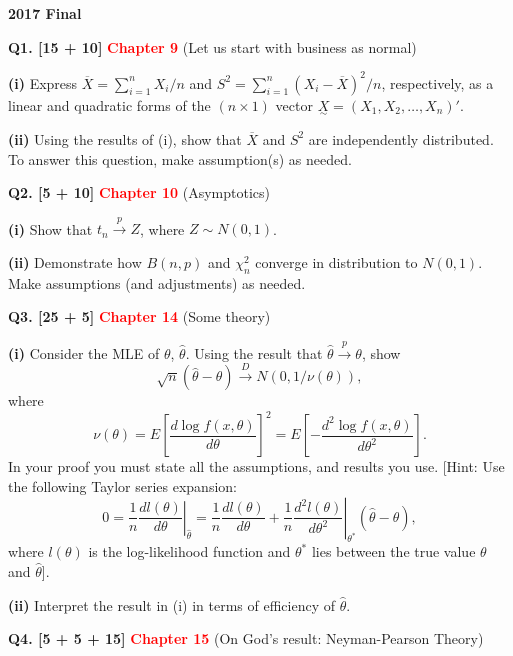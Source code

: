 \documentclass[11pt]{article}
\begin{document}
\begin{center}
    {\Large\bfseries 2017 Final}
\end{center}

\vspace{1em}

\textbf{Q1. [15 + 10]} \textbf{\textcolor{red}{Chapter 9}} (Let us start with business as normal)

\textbf{(i)} Express $\overline X=\sum_{i=1}^{n}X_i/n$ and $S^2=\sum_{i=1}^{n}(X_i-\overline X)^2/n$, respectively, as a linear and quadratic forms of the $(n\times 1)$ vector $\underset{\sim}{X}=(X_1,X_2,\ldots,X_n)'$.

\textbf{(ii)} Using the results of (i), show that $\overline X$ and $S^2$ are independently distributed. To answer this question, make assumption(s) as needed.

\bigskip

\textbf{Q2. [5 + 10]} \textbf{\textcolor{red}{Chapter 10}} (Asymptotics)

\textbf{(i)} Show that $t_n\overset{p}{\longrightarrow} Z$, where $Z\sim N(0,1)$.

\textbf{(ii)} Demonstrate how $B(n,p)$ and $\chi_n^2$ converge in distribution to $N(0,1)$. Make assumptions (and adjustments) as needed.

\bigskip

\textbf{Q3. [25 + 5]} \textbf{\textcolor{red}{Chapter 14}} (Some theory)

\textbf{(i)} Consider the MLE of $\theta$, $\hat\theta$. Using the result that $\hat\theta\overset{p}{\longrightarrow}\theta$, show
\[
\sqrt{n}(\hat\theta-\theta)\overset{D}{\longrightarrow}N\left(0,1/\nu(\theta)\right),
\]
where
\[
\nu(\theta)=E\left[\frac{d\log f(x,\theta)}{d\theta}\right]^2
=E\left[-\frac{d^2\log f(x,\theta)}{d\theta^2}\right].
\]
In your proof you must state all the assumptions, and results you use. [Hint: Use the following Taylor series expansion:
\[
0=\left.\frac{1}{n}\frac{dl(\theta)}{d\theta}\right|_{\hat\theta}
=\frac{1}{n}\frac{dl(\theta)}{d\theta}
+\left.\frac{1}{n}\frac{d^2 l(\theta)}{d\theta^2}\right|_{\theta^*}(\hat\theta-\theta),
\]
where $l(\theta)$ is the log-likelihood function and $\theta^*$ lies between the true value $\theta$ and $\hat\theta$].

\textbf{(ii)} Interpret the result in (i) in terms of efficiency of $\hat\theta$.

\bigskip

\textbf{Q4. [5 + 5 + 15]} \textbf{\textcolor{red}{Chapter 15}} (On God's result: Neyman-Pearson Theory)
\end{document}
